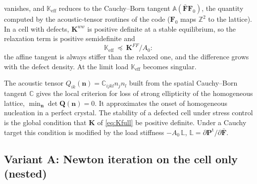 \documentclass[11pt,a4paper]{article}
\newcommand{\Fb}{\bar{\mathbf F}}
\newcommand{\Pt}{\mathbf P^{\mathrm t}}
\newcommand{\F}{\mathbf F}
\begin{document}
vanishes, and \(\mathbb K_{\mathrm{eff}}\) reduces to
the Cauchy--Born tangent \(\mathbb A(\Fb\F_0)\), the quantity computed by the acoustic-tensor
routines of the code (\(\F_0\) maps \(\mathbb Z^2\) to the lattice). In a cell with defects, \(\mathbf
K^{ww}\) is positive definite at a stable equilibrium, so the relaxation term is positive
semidefinite and
\begin{equation}
  \mathbb K_{\mathrm{eff}}\ \preceq\ \mathbf K^{FF}/A_0 :
  \label{eq:voigt}
\end{equation}
the affine tangent is always stiffer than the relaxed one, and the difference grows with the
defect density. At the limit load \(\mathbb K_{\mathrm{eff}}\) becomes singular.

The acoustic tensor \(Q_{ik}(\mathbf n)=\mathbb C_{ijkl}n_jn_l\) built from the spatial Cauchy--Born
tangent \(\mathbb C\) gives the local criterion for loss of strong ellipticity of the homogeneous
lattice, \(\min_{\mathbf n}\det\mathbf Q(\mathbf n)=0\). It approximates the onset of homogeneous
nucleation in a perfect crystal. The stability of a defected cell under stress control is the
global condition that \(\mathbf K\) of \eqref{eq:Kfull} be positive definite. Under a Cauchy target
this condition is modified by the load stiffness \(-A_0\,\mathbb L\),
\(\mathbb L=\partial\Pt/\partial\Fb\).

\subsection{Variant A: Newton iteration on the cell only (nested)}
\end{document}
